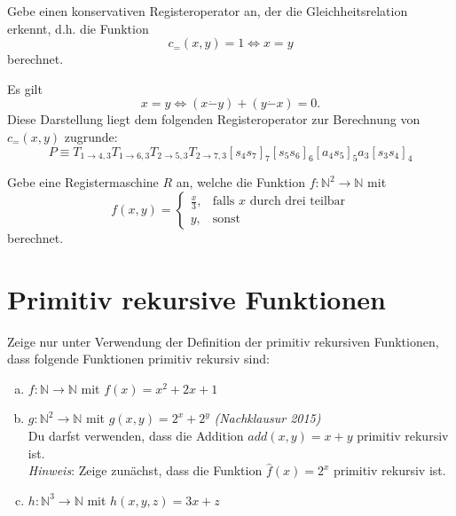 \documentclass[german,headsepline]{scrartcl}
\theoremstyle{definition}
\begin{document}
	\begin{question}[subtitle={Nachklausur 2015}]
		Gebe einen konservativen Registeroperator an,
		der die Gleichheitsrelation erkennt, d.h. die Funktion
		\[c_=(x,y)=1\Leftrightarrow x=y\]
		berechnet.
	\end{question}
	\begin{solution}
		Es gilt
		\[x=y\Leftrightarrow (x\dot{-}y)+(y\dot{-}x)=0.\]
		Diese Darstellung liegt dem folgenden Registeroperator zur Berechnung von $c_=(x,y)$ zugrunde:
		\[P\equiv T_{1\to4,3}T_{1\to6,3}T_{2\to5,3}T_{2\to7,3}[s_4s_7]_7[s_5s_6]_6[a_4s_5]_5a_3[s_3s_4]_4\]
	\end{solution}
	
	\begin{question}[subtitle={Blatt 13, 2015}]
		Gebe eine Registermaschine $R$ an, welche die Funktion $f:\mathbb{N}^2\to\mathbb{N}$ mit
		\[f(x,y)=\begin{cases}
			\frac{x}{3}, &\text{falls $x$ durch drei teilbar} \\
			y, &\text{sonst}
		\end{cases}\]
		berechnet.
	\end{question}
	
	\section{Primitiv rekursive Funktionen}
	\begin{question}
		Zeige nur unter Verwendung der Definition der primitiv rekursiven Funktionen,
		dass folgende Funktionen primitiv rekursiv sind:
		\begin{enumerate}[(a)]
			\item $f:\mathbb{N}\to\mathbb{N}$ mit $f(x)=x^2+2x+1$
			\item $g:\mathbb{N}^2\to\mathbb{N}$ mit $g(x,y)=2^x+2^y$
				\hfill\textit{(Nachklausur 2015)} \\
				Du darfst verwenden, dass die Addition $add(x,y)=x+y$ primitiv rekursiv ist. \\
				\textit{Hinweis}: Zeige zunächst, dass die Funktion $\hat{f}(x)=2^x$ primitiv rekursiv ist.
			\item $h:\mathbb{N}^3\to\mathbb{N}$ mit $h(x,y,z)=3x+z$
		\end{enumerate}
	\end{question}
	
\end{document}
